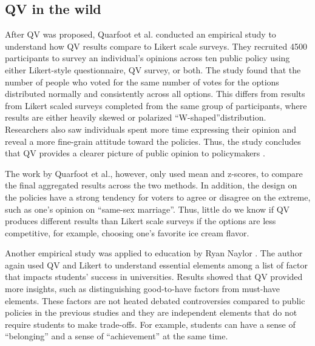\subsection{QV in the wild}
After QV was proposed,
Quarfoot et al. conducted an 
empirical study to understand how 
QV results compare to Likert scale surveys.
They recruited 4500 participants 
to survey an individual's opinions
across ten public policy
using either Likert-style questionnaire, QV survey, or both.
The study found that the number of people
who voted for the same number of votes
for the options 
distributed normally and consistently across all options.
This differs from results from Likert scaled surveys 
completed from the same group of participants,
where results are either heavily skewed 
or polarized ``W-shaped''distribution.
Researchers also saw individuals 
spent more time expressing their opinion
and reveal a more fine-grain attitude 
toward the policies.
Thus, the study concludes that 
QV provides a clearer picture 
of public opinion to policymakers
\cite{quarfoot2017quadratic}.

The work by Quarfoot et al., however,
only used mean and z-scores,
to compare the final aggregated results 
across the two methods.
In addition, 
the design on the policies 
have a strong tendency for voters
to agree or disagree on the extreme,
such as one's opinion on ``same-sex marriage''.
Thus, little do we know if
QV produces different results 
than Likert scale surveys
if the options are less competitive,
for example, choosing one's favorite ice cream flavor.\par

Another empirical study was applied to education 
by Ryan Naylor \cite{naylor2017first}. 
The author again used QV and Likert
to understand essential elements 
among a list of factor
that impacts students' success in universities.
Results showed that QV provided more insights, 
such as distinguishing good-to-have factors from must-have elements.
These factors are not heated debated controversies
compared to public policies in the previous studies and 
they are independent elements that do not require 
students to make trade-offs.
For example, students can have a sense of ``belonging'' and
a sense of ``achievement'' at the same time.

